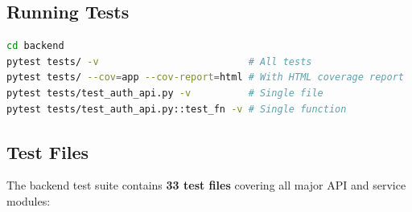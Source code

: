 \documentclass[10pt,a4paper]{report}
\begin{document}
\subsection{Running Tests}

\begin{lstlisting}[language=bash]
cd backend
pytest tests/ -v                          # All tests
pytest tests/ --cov=app --cov-report=html # With HTML coverage report
pytest tests/test_auth_api.py -v          # Single file
pytest tests/test_auth_api.py::test_fn -v # Single function
\end{lstlisting}

\subsection{Test Files}

The backend test suite contains \textbf{33 test files} covering all major API and service modules:
\end{document}
